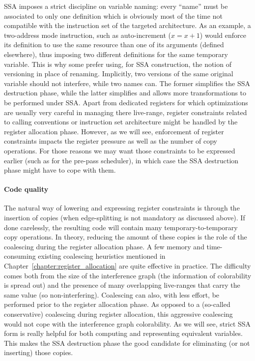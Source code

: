 SSA imposes a strict discipline on variable naming: 
every ``name'' must be associated to only one definition which is obviously most of the time not compatible with the instruction set of the targeted architecture. 
As an example, a two-address mode instruction, such as auto-increment ($x=x+1$) would enforce its definition to use the same resource than one of its arguments (defined elsewhere), thus imposing two different definitions for the same temporary variable. 
This is why some prefer using, for SSA construction, the notion of versioning in place of renaming. 
Implicitly, two versions of the same original variable should not interfere, while two names can. 
The former simplifies the SSA destruction phase, while the latter simplifies and allows more transformations to be performed under SSA. 
Apart from dedicated registers for which optimizations are usually very careful in managing there live-range, register constraints related to calling conventions or instruction set architecture might be handled by the register allocation phase. 
However, as we will see, enforcement of register constraints impacts the register pressure as well as the number of copy operations. 
For those reasons we may want those constraints to be expressed earlier (such as for the pre-pass scheduler), in which case the SSA destruction phase might have to cope with them.

\paragraph{Code quality}
The natural way of lowering \phifuns and expressing register constraints is through the insertion of copies (when edge-splitting is not mandatory as discussed above). 
If done carelessly, the resulting code will contain many temporary-to-temporary copy operations. 
In theory, reducing the amount of these copies is the role of the coalescing during the register allocation phase. 
A few memory and time-consuming existing coalescing heuristics mentioned in Chapter~\ref{chapter:register_allocation} are quite effective in practice. 
The difficulty comes both from the size of the interference graph (the information of colorability is spread out) and the presence of many overlapping live-ranges that carry the same value (so non-interfering). 
Coalescing can also, with less effort, be performed prior to the register allocation phase. 
As opposed to a (so-called conservative) coalescing during register allocation, this aggressive coalescing would not cope with the interference graph colorability. 
As we will see, strict SSA form is really helpful for both computing and representing equivalent variables. 
This makes the SSA destruction phase the good candidate for eliminating (or not inserting) those copies.

